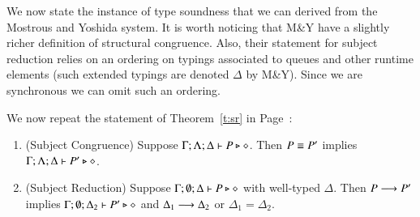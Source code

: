 We now state the instance of type soundness that we
can derived from the Mostrous and Yoshida system.
It is worth noticing that M\&Y have a slightly richer
definition of structural congruence.
Also, their statement for subject reduction relies on an 
ordering on typings associated to queues and other 
runtime elements (such extended typings are denoted $\Delta$ by M\&Y).
Since we are synchronous we can omit such an ordering.

We now repeat the statement of
Theorem~\ref{t:sr} in Page~\pageref{t:sr}:

\begin{theorem}\rm
	\begin{enumerate}[1.]
		\item	(Subject Congruence) Suppose $\Gamma; \Lambda; \Delta \vdash P \triangleright \diamond$.
			Then $P \equiv P'$ implies $\Gamma; \Lambda; \Delta \vdash P' \triangleright \diamond$.

		\item	(Subject Reduction) Suppose $\Gamma; \emptyset; \Delta \vdash P \triangleright \diamond$
			with
			well-typed $\Delta$.
			Then $P \longrightarrow P'$ implies $\Gamma; \emptyset; \Delta_2  \vdash P' \triangleright \diamond$
			and $\Delta_1 \longrightarrow \Delta_2$ or $\Delta_1 = \Delta_2$.
	\end{enumerate}
\end{theorem}

